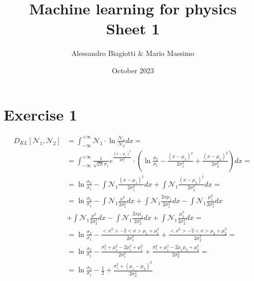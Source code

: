 \documentclass{article}
\title{Machine learning for physics \\ \large Sheet 1}
\author{Alessandro Biagiotti \& Mario Massimo}
\date{October 2023}
\newcommand{\gss}{\mathcal{N}}
\newcommand{\gexp}[1]{\frac{1}{\sqrt{2\pi} \sigma_{#1}} e^{\frac{(x - \mu_{#1})^2}{2\sigma_{#1}^2}}}
\begin{document}
\maketitle
\section{Exercise 1}
\begin{align*}
    D_{KL}[\mathcal{N}_1, \mathcal{N}_2] &= \int_{-\infty}^{+\infty}{\gss_1 \cdot \ln{\frac{\gss_1}{\gss_2}} dx} =\\
    &= \int_{-\infty}^{+\infty}{\gexp{1} \cdot \left(\ln{\frac{\sigma_2}{\sigma_1}} - \frac{(x - \mu_1)^2}{2\sigma_1^2} + \frac{(x - \mu_2)^2}{2\sigma_2^2}\right)dx} =\\
    &= \ln{\frac{\sigma_2}{\sigma_1}} - \int{\gss_1\frac{(x - \mu_1)^2}{2\sigma_1^2}dx} + \int{\gss_1\frac{(x - \mu_2)^2}{2\sigma_2^2}dx} =\\
    &= \ln{\frac{\sigma_2}{\sigma_1}} - \int{\gss_1\frac{x^2}{2\sigma_1^2}dx} + \int{\gss_1\frac{2x\mu_1}{2\sigma_1^2}dx} - \int{\gss_1\frac{\mu_1^2}{2\sigma_1^2}dx} \\
    &+ \int{\gss_1\frac{x^2}{2\sigma_2^2}dx} - \int{\gss_1\frac{2x\mu_2}{2\sigma_2^2}dx} + \int{\gss_1\frac{\mu_2^2}{2\sigma_2^2}dx} =\\
    &= \ln{\frac{\sigma_2}{\sigma_1}} - \frac{<x^2> - 2<x>\mu_1 + \mu_1^2}{2\sigma_1^2} + \frac{<x^2> - 2<x>\mu_2 + \mu_2^2}{2\sigma_2^2} =\\
    &= \ln{\frac{\sigma_2}{\sigma_1}} - \frac{\sigma_1^2 + \mu_1^2 - 2\mu_1^2 + \mu_1^2}{2\sigma_1^2} + \frac{\sigma_1^2 + \mu_1^2 - 2\mu_1\mu_2 + \mu_2^2}{2\sigma_2^2} =\\
    &= \ln{\frac{\sigma_2}{\sigma_1}} - \frac{1}{2} + \frac{\sigma_1^2 + (\mu_1 - \mu_2)^2}{2\sigma_2^2}
\end{align*}
\end{document}
